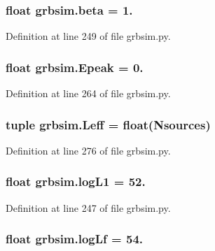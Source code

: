 \hypertarget{namespacegrbsim_a057e0c49b2a8f4242d3873363f85a4f6}{
\subsubsection[{beta}]{\setlength{\rightskip}{0pt plus 5cm}float grbsim.\-beta = 1.}}\label{namespacegrbsim_a057e0c49b2a8f4242d3873363f85a4f6}


Definition at line 249 of file grbsim.\-py.

\hypertarget{namespacegrbsim_ac4e8aebc939db206d2bf1aa8746e809f}{
\subsubsection[{Epeak}]{\setlength{\rightskip}{0pt plus 5cm}float grbsim.\-Epeak = 0.}}\label{namespacegrbsim_ac4e8aebc939db206d2bf1aa8746e809f}


Definition at line 264 of file grbsim.\-py.

\hypertarget{namespacegrbsim_ae42e5cb04bc80b1e6619262c20af25ab}{
\subsubsection[{Leff}]{\setlength{\rightskip}{0pt plus 5cm}tuple grbsim.\-Leff = float({\bf Nsources})}}\label{namespacegrbsim_ae42e5cb04bc80b1e6619262c20af25ab}


Definition at line 276 of file grbsim.\-py.

\hypertarget{namespacegrbsim_a4e99c840af19a77b589f1eab0300d65e}{
\subsubsection[{log\-L1}]{\setlength{\rightskip}{0pt plus 5cm}float grbsim.\-log\-L1 = 52.}}\label{namespacegrbsim_a4e99c840af19a77b589f1eab0300d65e}


Definition at line 247 of file grbsim.\-py.

\hypertarget{namespacegrbsim_a515d46acf1133ef8db408bfb7c993086}{
\subsubsection[{log\-Lf}]{\setlength{\rightskip}{0pt plus 5cm}float grbsim.\-log\-Lf = 54.}}\label{namespacegrbsim_a515d46acf1133ef8db408bfb7c993086}



